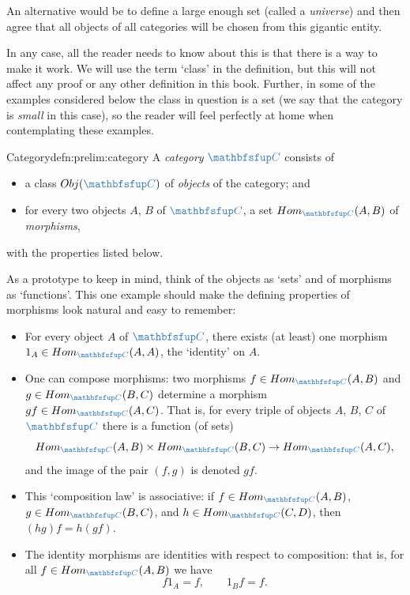 An alternative would be to define a large enough set (called a
\emph{universe}) and then agree that all objects of all categories
will be chosen from this gigantic entity.

In any case, all the reader needs to know about this is that there is
a way to make it work. We will use the term `class' in the definition,
but this will not affect any proof or any other definition in this
book. Further, in some of the examples considered below the class in
question is a set (we say that the category is \emph{small} in this
case), so the reader will feel perfectly at home when contemplating
these examples.

\begin{defn}{Category}{defn:prelim:category}
  A \emph{category} $\categ{C}$ consists of
  \begin{itemize}
  \item a class $\Obj(\categ{C})$ of \emph{objects} of the category;
    and
  \item for every two objects $A$, $B$ of $\categ{C}$, a set
    $\Hom_{\categ{C}}(A, B)$ of \emph{morphisms},
  \end{itemize}
  with the properties listed below.
\end{defn}

As a prototype to keep in mind, think of the objects as `sets' and of
morphisms as `functions'. This one example should make the defining
properties of morphisms look natural and easy to remember:
\begin{itemize}
\item For every object $A$ of $\categ{C}$, there exists (at least) one
  morphism $1_A \in \Hom_{\categ{C}}(A, A)$, the `identity' on $A$.
\item One can compose morphisms: two morphisms
  $f \in \Hom_{\categ{C}}(A, B)$ and $g \in \Hom_{\categ{C}}(B, C)$
  determine a morphism $gf \in \Hom_{\categ{C}}(A, C)$. That is, for
  every triple of objects $A$, $B$, $C$ of $\categ{C}$ there is a
  function (of sets)
  \[ \Hom_{\categ{C}}(A, B) \times \Hom_{\categ{C}}(B, C) \to
    \Hom_{\categ{C}}(A, C), \] and the image of the pair $(f, g)$ is
  denoted $gf$.
\item This `composition law' is associative: if
  $f \in \Hom_{\categ{C}}(A, B)$, $g \in \Hom_{\categ{C}}(B, C)$, and
  $h \in \Hom_{\categ{C}}(C, D)$, then $(hg)f = h(gf)$.
\item The identity morphisms are identities with respect to
  composition: that is, for all $f \in \Hom_{\categ{C}}(A, B)$ we have
  \[ f 1_A = f, \qquad 1_B f = f. \]
\end{itemize}

